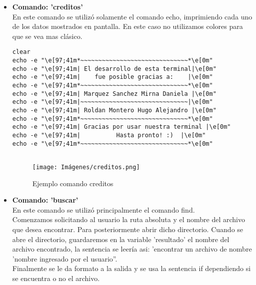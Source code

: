 \documentclass[letterpaper,12pt]{article} %
\begin{document}
\begin{itemize}
\begin{lstlisting}
echo -e "${rojo}Informacion de la PC y kernel:"
echo ""

echo -e "${rojo}Distribucion y version:${sincolor}"
echo "-----------------------"
cat /etc/os-release | grep -e "^NAME=" -e "^VERSION="

echo -e "${rojo}Informacion de la CPU:${sincolor}"
echo "----------------------"
cat /proc/cpuinfo | grep -m 1 "model name"
echo -e "${rojo}Arquitectura del sistema:${sincolor} $(uname -m)"

echo -e "${rojo}Memoria RAM:${sincolor}"
echo "-------------------------------"
lspci | grep -i --color 'RAM memory:'
echo -e "${amarillo}Memoria total:${sincolor} $(cat /proc/meminfo | grep -i "Memtotal:" | grep '[1-9].*' -o)"
echo -e "${azul}Memoria Libre:${sincolor} $(cat /proc/meminfo | grep -i "Memfree:" | grep '[1-9].*' -o)"
    \end{lstlisting}
\begin{figure}[H]
\caption{Ejemplo comando infosis, que muestra algunas especificaciones del sistema}
\centering
\texttt{[image: Imágenes/infosis.png]}
\end{figure}

    
     \item \textbf{Comando: 'creditos'}\\
     En este comando se utilizó solamente el comando echo, imprimiendo cada uno de los datos mostrados en pantalla. En este caso no utilizamos colores para que se vea mas clásico. 
     \begin{lstlisting}
clear
echo -e "\e[97;41m*~~~~~~~~~~~~~~~~~~~~~~~~~~~~~~*\e[0m"
echo -e "\e[97;41m| El desarrollo de esta terminal|\e[0m"
echo -e "\e[97;41m|    fue posible gracias a:    |\e[0m" 
echo -e "\e[97;41m*~~~~~~~~~~~~~~~~~~~~~~~~~~~~~~*\e[0m"
echo -e "\e[97;41m| Marquez Sanchez Mirna Daniela |\e[0m"
echo -e "\e[97;41m|~~~~~~~~~~~~~~~~~~~~~~~~~~~~~~|\e[0m"
echo -e "\e[97;41m| Roldan Montero Hugo Alejandro |\e[0m"
echo -e "\e[97;41m*~~~~~~~~~~~~~~~~~~~~~~~~~~~~~~*\e[0m"
echo -e "\e[97;41m| Gracias por usar nuestra terminal |\e[0m"
echo -e "\e[97;41m|          Hasta pronto! :)  |\e[0m"
echo -e "\e[97;41m*~~~~~~~~~~~~~~~~~~~~~~~~~~~~~~*\e[0m"
     
     \end{lstlisting}
\begin{figure}[H]
\caption{Ejemplo comando creditos}
\centering
\texttt{[image: Imágenes/creditos.png]}
\end{figure}
     \item \textbf{Comando: 'buscar'}\\
     En este comando se utilizó principalmente el comando find.\\
     Comenzamos solicitando al usuario la ruta absoluta y el nombre del archivo que desea encontrar. Para posteriormente abrir dicho directorio.
     Cuando se abre el directorio, guardaremos en la variable 'resultado' el nombre del archivo encontrado, la sentencia se leería asi: 'encontrar un archivo de nombre 'nombre ingresado por el usuario''.\\
     Finalmente se le da formato a la salida y se usa la sentencia if dependiendo si se encuentra o no el archivo.


\end{itemize}
\end{document}
